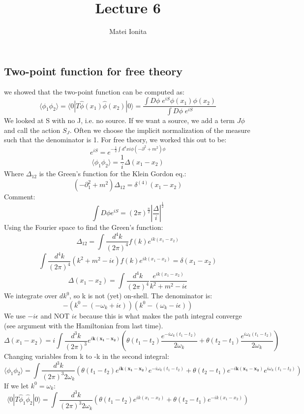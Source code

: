 \documentclass[12 pt]{article}
\title{Lecture 6}
\author{Matei Ionita}
\begin{document}
  \maketitle

\subsection*{Two-point function for free theory}
we showed that the two-point function can be computed as:
\[ \langle \phi_1 \phi_2 \rangle =  \langle 0 | T \hat \phi(x_1) \hat \phi(x_2) |0 \rangle = \frac{\int D\phi\; e^{iS} \phi (x_1) \phi(x_2)}{\int D \phi\; e^{iS}} \]
We looked at S with no J, i.e. no source. If we want a source, we add a term $J \phi$ and call the action $S_J$. Often we choose the implicit normalization of the measure such that the denominator is 1. For free theory, we worked this out to be:
\[  e^{iS} = e^{-\frac{1}{2} \int d^4 x i \phi (-\partial^2 + m^2) \phi} \]
\[  \langle \phi_1 \phi_2\rangle = \frac{1}{i} \Delta(x_1 - x_2)  \]
Where $\Delta_{12}$ is the Green's function for the Klein Gordon eq.:
\[ ( -\partial^2_{1} + m^2 ) \Delta_{12} = \delta^{(4)} (x_1-x_2) \]
Comment:
\[   \int D\phi e^{iS} = (2\pi)^{\frac{n}{2}} \left|\frac{\Delta}{i}\right|^{\frac{1}{2}} \]
Using the Fourier space to find the Green's function:
\[  \Delta_{12} = \int \frac{d^4 k}{(2\pi)^4} f(k) e^{ik(x_1 - x_2)} \]
\[  \int \frac{d^4 k}{(2\pi)^4} (k^2+m^2 -i\epsilon) f(k) e^{ik(x_1 - x_2)} = \delta(x_1-x_2) \]
\[  \Delta(x_1 - x_2) = \int \frac{d^4 k}{(2\pi)^4} \frac{e^{ik(x_1-x_2)}}{k^2+m^2 - i \epsilon}  \]
We integrate over $d k^0$, so k is not (yet) on-shell. The denominator is:
\[ - (k^0 - (- \omega_k + i\epsilon))(k^0 - (\omega_k - i \epsilon)) \]
We use $-i\epsilon$ and NOT $i\epsilon$ because this is what makes the path integral converge (see argument with the Hamiltonian from last time).
\[  \Delta(x_1-x_2) = i \int \frac{d^3 k}{(2\pi)^3} e^{i\mathbf{k (x_1-x_2)}} \left( \theta(t_1 - t_2) \frac{e^{-i\omega_k (t_1-t_2)}}{2\omega_k} + \theta(t_2 - t_1) \frac{e^{i\omega_k(t_1-t_2) }} {2\omega_k} \right)  \]
Changing variables from k to -k in the second integral:
\[  \langle \phi_1 \phi_2 \rangle = \int \frac{d^3 k}{(2\pi)^3 2\omega_k} \left( \theta(t_1 - t_2) e^{i\mathbf{k (x_1-x_2)}} e^{-i\omega_k (t_1-t_2)} + \theta(t_2 - t_1) e^{-i\mathbf{k (x_1-x_2)}} e^{i\omega_k(t_1-t_2) } \right)  \]
If we let $k^0 = \omega_k$:
\[ \langle 0| T \hat \phi_1 \hat \phi_2|0 \rangle = \int \frac{d^3 k}{(2\pi)^3 2\omega_k} \left( \theta(t_1 - t_2) e^{ik (x_1-x_2)} + \theta(t_2 - t_1) e^{-ik (x_1-x_2)} \right)   \]
\end{document}
